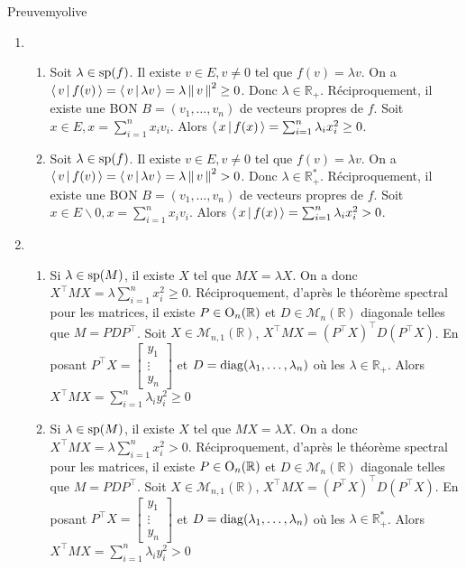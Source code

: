     \begin{demo}{Preuve}{myolive}
        \begin{enumerate}
            \item \begin{enumerate}
                \item Soit $\lambda \in \sp(f)$. Il existe $v \in E, v \neq 0$ tel que $f(v) = \lambda v$. On a $\spr{v}{f(v)} = \spr{v}{\lambda v} = \lambda \norm{v}^2 \geq 0$. Donc $\lambda \in \mathbb{R}_+$. Réciproquement, il existe une BON  $B = (v_1,\ldots,v_n)$ de vecteurs propres de $f$. Soit $x \in E, x = \sum_{i=1}^{n} x_i v_i$. Alors $\spr{x}{f(x)} = \sum_{i=1}^{n} \lambda_i x_i^2 \geq 0$.
                \item Soit $\lambda \in \sp(f)$. Il existe $v \in E, v \neq 0$ tel que $f(v) = \lambda v$. On a $\spr{v}{f(v)} = \spr{v}{\lambda v} = \lambda \norm{v}^2 > 0$. Donc $\lambda \in \mathbb{R}_+^*$. Réciproquement, il existe une BON  $B = (v_1,\ldots,v_n)$ de vecteurs propres de $f$. Soit $x \in E \backslash {0}, x = \sum_{i=1}^{n} x_i v_i$. Alors $\spr{x}{f(x)} = \sum_{i=1}^{n} \lambda_i x_i^2 > 0$.
            \end{enumerate}
            \item \begin{enumerate}
                \item Si $\lambda \in \sp(M)$, il existe $X$ tel que $MX = \lambda X$. On a donc $X^{\top} M X = \lambda \sum_{i=1}^{n} x_i^2 \geq 0$. Réciproquement, d’après le théorème spectral pour les matrices, il existe $P \in \O_n(\mathbb{R})$ et $D \in \mathcal{M}_n(\mathbb{R})$ diagonale telles que $M = P D P^{\top}$. Soit $X \in \mathcal{M}_{n,1}(\mathbb{R})$, $X^{\top} M X = (P^{\top} X)^{\top} D (P^{\top} X)$. En posant $P^{\top} X = \begin{bmatrix}
                    y_1 \\
                    \vdots \\
                    y_n
                \end{bmatrix}$ et $D = \diag(\lambda_1,\ldots,\lambda_n)$ où les $\lambda \in \mathbb{R}_+$. Alors $X^{\top} M X = \sum_{i=1}^{n} \lambda_i y_i^2 \geq 0$
                \item Si $\lambda \in \sp(M)$, il existe $X$ tel que $MX = \lambda X$. On a donc $X^{\top} M X = \lambda \sum_{i=1}^{n} x_i^2 > 0$. Réciproquement, d’après le théorème spectral pour les matrices, il existe $P \in \O_n(\mathbb{R})$ et $D \in \mathcal{M}_n(\mathbb{R})$ diagonale telles que $M = P D P^{\top}$. Soit $X \in \mathcal{M}_{n,1}(\mathbb{R})$, $X^{\top} M X = (P^{\top} X)^{\top} D (P^{\top} X)$. En posant $P^{\top} X = \begin{bmatrix}
                    y_1 \\
                    \vdots \\
                    y_n
                \end{bmatrix}$ et $D = \diag(\lambda_1,\ldots,\lambda_n)$ où les $\lambda \in \mathbb{R}_+^*$. Alors $X^{\top} M X = \sum_{i=1}^{n} \lambda_i y_i^2 > 0$
            \end{enumerate}
        \end{enumerate}
    \end{demo}

